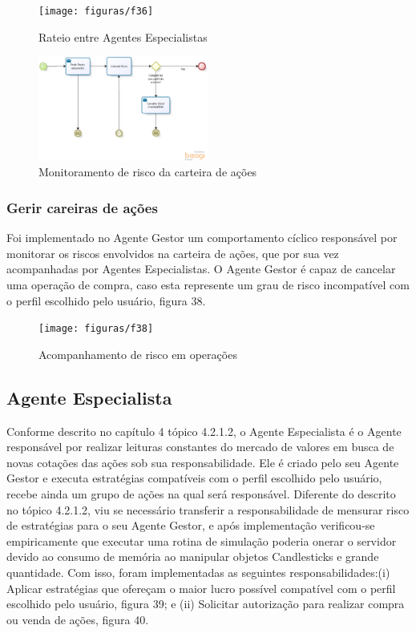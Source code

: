 \begin{figure}[h]
\centering
\label{f36}
\texttt{[image: figuras/f36]}
\caption{Rateio entre Agentes Especialistas}
\end{figure}

\begin{figure}[h]
\centering
\label{f37}
\includegraphics[width=0.5\textwidth]{figuras/f37}
\caption{Monitoramento de risco da carteira de ações}
\end{figure}

\subsubsection{Gerir careiras de ações}
Foi implementado no Agente Gestor um comportamento cíclico responsável por monitorar os riscos envolvidos na carteira de ações, que por sua vez acompanhadas por Agentes Especialistas. O Agente Gestor é capaz de cancelar uma operação de compra, caso esta represente um grau de risco incompatível com o perfil escolhido pelo usuário, figura 38.

\begin{figure}[h]
\centering
\label{f38}
\texttt{[image: figuras/f38]}
\caption{Acompanhamento de risco em operações}
\end{figure}

\subsection{Agente Especialista}

Conforme descrito no capítulo 4 tópico 4.2.1.2, o Agente Especialista é o Agente responsável por realizar leituras constantes do mercado de valores em busca de novas cotações das ações sob sua responsabilidade. Ele é criado pelo seu Agente Gestor e executa estratégias compatíveis com o perfil escolhido pelo usuário, recebe ainda um grupo de ações na qual será responsável. Diferente do descrito no tópico 4.2.1.2, viu se necessário transferir a responsabilidade de mensurar risco de estratégias para o seu Agente Gestor, e após implementação verificou-se empiricamente que executar uma rotina de simulação poderia onerar o servidor devido ao consumo de memória ao manipular objetos Candlesticks e grande quantidade. Com isso, foram implementadas as seguintes responsabilidades:(i) Aplicar estratégias que ofereçam o maior lucro possível compatível com o perfil escolhido pelo usuário, figura 39; e (ii) Solicitar autorização para realizar compra ou venda de ações, figura 40.

